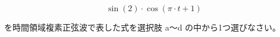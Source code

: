 \[
\sin(2)  \cdot \cos ( \pi \cdot t +1)
\]

\bigskip
\noindent を時間領域複素正弦波で表した式を選択肢 a〜d の中から1つ選びなさい。
